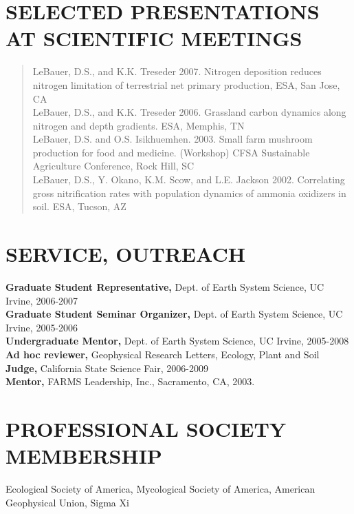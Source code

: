 \documentclass[line,10pt]{res}
\begin{document}
\begin{resume}
\section{SELECTED PRESENTATIONS AT SCIENTIFIC MEETINGS}
\begin{verse}LeBauer, D.S., and K.K. Treseder 2007. Nitrogen deposition reduces nitrogen limitation of terrestrial net primary production, ESA, San Jose, CA\\
LeBauer, D.S., and K.K. Treseder 2006. Grassland carbon dynamics along nitrogen and depth gradients. ESA, Memphis, TN\\
LeBauer, D.S. and O.S. Isikhuemhen. 2003. Small farm mushroom production for food and medicine. (Workshop) CFSA Sustainable Agriculture Conference, Rock Hill, SC\\
LeBauer, D.S., Y. Okano, K.M. Scow, and L.E. Jackson 2002. Correlating gross nitrification rates with population dynamics of ammonia oxidizers in soil. ESA, Tucson, AZ\end{verse}
\section{SERVICE, OUTREACH} 
{\bf Graduate Student Representative,} Dept. of Earth System Science, UC Irvine, 2006-2007\\  {\bf Graduate Student Seminar Organizer,} Dept. of Earth System Science, UC Irvine, 2005-2006\\ 
{\bf Undergraduate Mentor,} Dept. of Earth System Science, UC Irvine, 2005-2008\\ 
{\bf  Ad hoc reviewer,} Geophysical Research Letters, Ecology, Plant and Soil\\ 
{\bf Judge,} California State Science Fair, 2006-2009\\
{\bf Mentor,} FARMS Leadership, Inc., Sacramento, CA, 2003.

\section{PROFESSIONAL SOCIETY MEMBERSHIP} Ecological Society of America, Mycological Society of America, American Geophysical Union, Sigma Xi

\end{resume}
\end{document}
